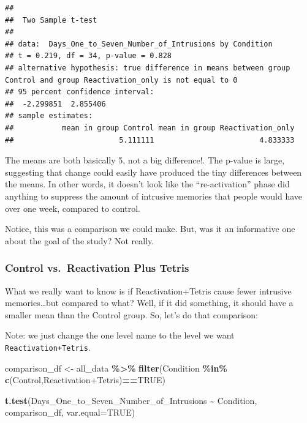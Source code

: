 \documentclass[
]{book}
\newenvironment{Shaded}{\begin{snugshade}}{\end{snugshade}}
\newcommand{\AttributeTok}[1]{\textcolor[rgb]{0.13,0.29,0.53}{#1}}
\newcommand{\ConstantTok}[1]{\textcolor[rgb]{0.56,0.35,0.01}{#1}}
\newcommand{\FunctionTok}[1]{\textcolor[rgb]{0.13,0.29,0.53}{\textbf{#1}}}
\newcommand{\NormalTok}[1]{#1}
\newcommand{\OtherTok}[1]{\textcolor[rgb]{0.56,0.35,0.01}{#1}}
\newcommand{\SpecialCharTok}[1]{\textcolor[rgb]{0.81,0.36,0.00}{\textbf{#1}}}
\newcommand{\StringTok}[1]{\textcolor[rgb]{0.31,0.60,0.02}{#1}}
\begin{document}
\begin{verbatim}
## 
##  Two Sample t-test
## 
## data:  Days_One_to_Seven_Number_of_Intrusions by Condition
## t = 0.219, df = 34, p-value = 0.828
## alternative hypothesis: true difference in means between group Control and group Reactivation_only is not equal to 0
## 95 percent confidence interval:
##  -2.299851  2.855406
## sample estimates:
##           mean in group Control mean in group Reactivation_only 
##                        5.111111                        4.833333
\end{verbatim}

The means are both basically 5, not a big difference!. The p-value is large, suggesting that change could easily have produced the tiny differences between the means. In other words, it doesn't look like the ``re-activation'' phase did anything to suppress the amount of intrusive memories that people would have over one week, compared to control.

Notice, this was a comparison we could make. But, was it an informative one about the goal of the study? Not really.

\hypertarget{control-vs.-reactivation-plus-tetris}{%
\subsubsection{Control vs.~Reactivation Plus Tetris}\label{control-vs.-reactivation-plus-tetris}}

What we really want to know is if Reactivation+Tetris cause fewer intrusive memories\ldots but compared to what? Well, if it did something, it should have a smaller mean than the Control group. So, let's do that comparison:

Note: we just change the one level name to the level we want \texttt{Reactivation+Tetris}.

\begin{Shaded}
\begin{Highlighting}[]
\NormalTok{comparison\_df }\OtherTok{\textless{}{-}}\NormalTok{ all\_data }\SpecialCharTok{\%\textgreater{}\%} 
                  \FunctionTok{filter}\NormalTok{(Condition }\SpecialCharTok{\%in\%} \FunctionTok{c}\NormalTok{(}\StringTok{\textquotesingle{}Control\textquotesingle{}}\NormalTok{,}\StringTok{\textquotesingle{}Reactivation+Tetris\textquotesingle{}}\NormalTok{)}\SpecialCharTok{==}\ConstantTok{TRUE}\NormalTok{)}
                        
\FunctionTok{t.test}\NormalTok{(Days\_One\_to\_Seven\_Number\_of\_Intrusions }\SpecialCharTok{\textasciitilde{}}\NormalTok{ Condition, }
\NormalTok{       comparison\_df,}
       \AttributeTok{var.equal=}\ConstantTok{TRUE}\NormalTok{)}
\end{Highlighting}
\end{Shaded}
\end{document}
